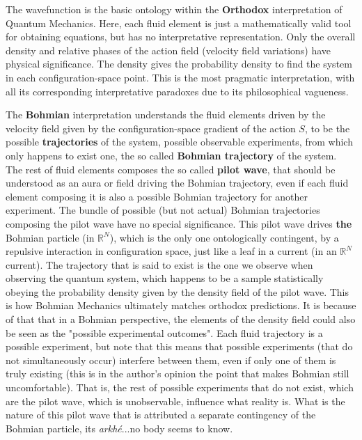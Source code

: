 \documentclass[11pt, a4paper]{article} %
\newcommand{\R}{\mathbb{R}} %
\begin{document}
The wavefunction is the basic ontology within the {\bf Orthodox} interpretation of Quantum Mechanics. Here, each fluid element is just a mathematically valid tool for obtaining equations, but has no interpretative representation. Only the overall density and relative phases of the action field (velocity field variations) have physical significance. The density gives the probability density to find the system in each configuration-space point. This is the most pragmatic interpretation, with all its corresponding interpretative paradoxes due to its philosophical vagueness. 

The {\bf Bohmian} interpretation understands the fluid elements driven by the velocity field given by the configuration-space gradient of the action $S$, to be the possible {\bf trajectories} of the system, possible observable experiments, from which only happens to exist one, the so called {\bf Bohmian trajectory} of the system. The rest of fluid elements composes the so called {\bf pilot wave}, that should be understood as an aura or field driving the Bohmian trajectory, even if each fluid element composing it is also a possible Bohmian trajectory for another experiment. The bundle of possible (but not actual) Bohmian trajectories composing the pilot wave have no special significance. This pilot wave drives {\bf the} Bohmian particle (in $\R^N$), which is the only one ontologically contingent, by a repulsive interaction in configuration space, just like a leaf in a current (in an $\R^N$ current). The trajectory that is said to exist is the one we observe when observing the quantum system, which happens to be a sample statistically obeying the probability density given by the density field of the pilot wave. This is how Bohmian Mechanics ultimately matches orthodox predictions. It is because of that that in a Bohmian perspective, the elements of the density field could also be seen as the "possible experimental outcomes". Each fluid trajectory is a possible experiment, but note that this means that possible experiments (that do not simultaneously occur) interfere between them, even if only one of them is truly existing (this is in the author's opinion the point that makes Bohmian still uncomfortable). That is, the rest of possible experiments that do not exist, which are the pilot wave, which is unobservable, influence what reality is. What is the nature of this pilot wave that is attributed a separate contingency of the Bohmian particle, its {\em arkhé}...no body seems to know.
\end{document}
